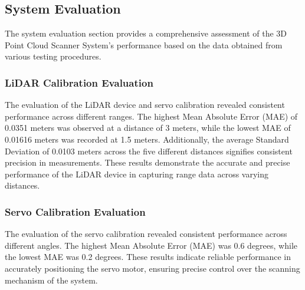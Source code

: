 


\subsection{System Evaluation}
The system evaluation section provides a comprehensive assessment of the 3D Point Cloud Scanner System's performance based on the data obtained from various testing procedures.

\subsubsection{LiDAR Calibration Evaluation}
The evaluation of the LiDAR device and servo calibration revealed consistent performance across different ranges. The highest Mean Absolute Error (MAE) of 0.0351 meters was observed at a distance of 3 meters, while the lowest MAE of 0.01616 meters was recorded at 1.5 meters. Additionally, the average Standard Deviation of 0.0103 meters across the five different distances signifies consistent precision in measurements. These results demonstrate the accurate and precise performance of the LiDAR device in capturing range data across varying distances.

\subsubsection{Servo Calibration Evaluation}
The evaluation of the servo calibration revealed consistent performance across different angles. The highest Mean Absolute Error (MAE) was 0.6 degrees, while the lowest MAE was 0.2 degrees. These results indicate reliable performance in accurately positioning the servo motor, ensuring precise control over the scanning mechanism of the system.


